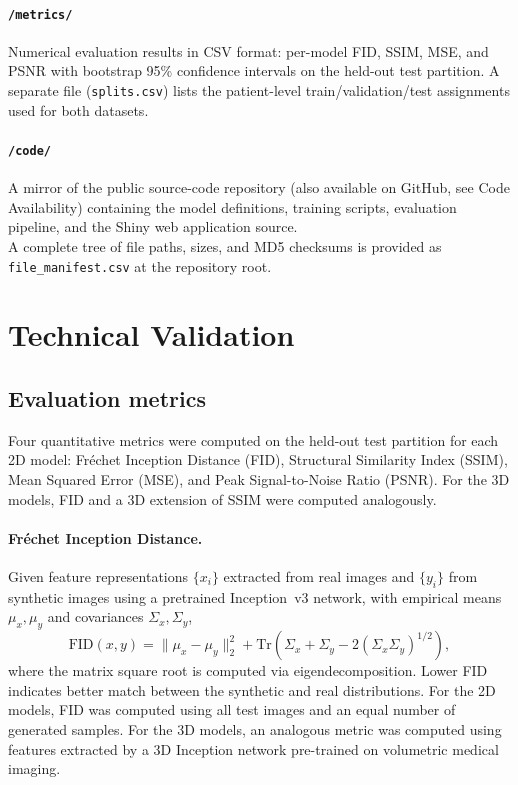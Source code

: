 \documentclass[11pt]{article}
\begin{document}
\paragraph{\texttt{/metrics/}} Numerical evaluation results in CSV format: per-model FID, SSIM, MSE, and PSNR with bootstrap 95\% confidence intervals on the held-out test partition. A separate file (\texttt{splits.csv}) lists the patient-level train/validation/test assignments used for both datasets.\\
\paragraph{\texttt{/code/}} A mirror of the public source-code repository (also available on GitHub, see Code Availability) containing the model definitions, training scripts, evaluation pipeline, and the Shiny web application source.\\
A complete tree of file paths, sizes, and MD5 checksums is provided as \texttt{file\_manifest.csv} at the repository root.

\section*{Technical Validation}
\label{sec:techval}

\subsection*{Evaluation metrics}

Four quantitative metrics were computed on the held-out test partition for each 2D model: Fr\'echet Inception Distance (FID)\cite{heusel2017gans}, Structural Similarity Index (SSIM)\cite{wang2004image}, Mean Squared Error (MSE), and Peak Signal-to-Noise Ratio (PSNR). For the 3D models, FID and a 3D extension of SSIM were computed analogously.

\paragraph{Fr\'echet Inception Distance.}
Given feature representations $\{x_i\}$ extracted from real images and $\{y_i\}$ from synthetic images using a pretrained Inception~v3 network\cite{heusel2017gans}, with empirical means $\mu_{x},\mu_{y}$ and covariances $\Sigma_{x},\Sigma_{y}$,
\begin{equation}
\text{FID}(x,y) = \lVert \mu_{x} - \mu_{y} \rVert_{2}^{2} + \mathrm{Tr}\!\left(\Sigma_{x} + \Sigma_{y} - 2\left(\Sigma_{x}\Sigma_{y}\right)^{1/2}\right),
\label{eq:fid}
\end{equation}
where the matrix square root is computed via eigendecomposition. Lower FID indicates better match between the synthetic and real distributions. For the 2D models, FID was computed using all test images and an equal number of generated samples. For the 3D models, an analogous metric was computed using features extracted by a 3D Inception network pre-trained on volumetric medical imaging\cite{chen2019med3d}.
\end{document}
